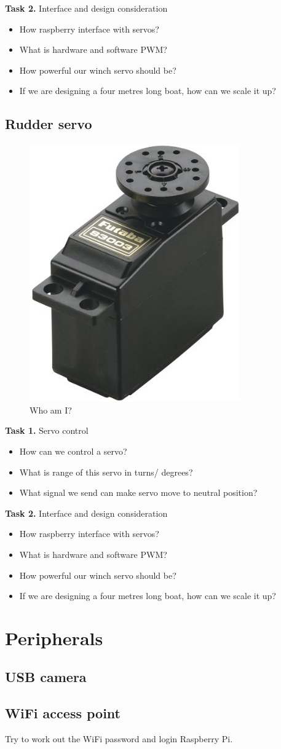 \documentclass[]{article}
\begin{document}
\textbf{Task 2.} Interface and design consideration
\begin{itemize}
	\item How raspberry interface with servos?
	\item What is hardware and software PWM?
	\item How powerful our winch servo should be?
	\item If we are designing a four metres long boat, how can we scale it up?
\end{itemize}


\subsection{Rudder servo}
\begin{figure}[h]
\centering
\includegraphics[width=0.4\linewidth]{futaba3003}
\caption{Who am I?}
\label{fig:futaba3003}
\end{figure}
\textbf{Task 1.} Servo control 
\begin{itemize}
	\item How can we control a servo?
	\item What is range of this servo in turns/ degrees?
	\item What signal we send can make servo move to neutral position? 
\end{itemize}

\textbf{Task 2.} Interface and design consideration
\begin{itemize}
	\item How raspberry interface with servos?
	\item What is hardware and software PWM?
	\item How powerful our winch servo should be?
	\item If we are designing a four metres long boat, how can we scale it up?
\end{itemize}

\section{Peripherals}
\subsection{USB camera}

\subsection{WiFi access point}
Try to work out the WiFi password and login Raspberry Pi.
\end{document}
